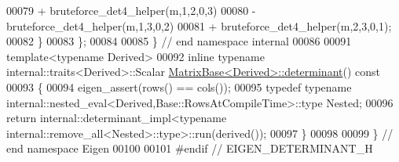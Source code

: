 \begin{DoxyCode}
00079           + bruteforce\_det4\_helper(m,1,2,0,3)
00080           - bruteforce\_det4\_helper(m,1,3,0,2)
00081           + bruteforce\_det4\_helper(m,2,3,0,1);
00082   \}
00083 \};
00084 
00085 \} \textcolor{comment}{// end namespace internal}
00086 
00091 \textcolor{keyword}{template}<\textcolor{keyword}{typename} Derived>
00092 \textcolor{keyword}{inline} \textcolor{keyword}{typename} internal::traits<Derived>::Scalar 
      \hyperlink{group___core___module_a7ad8f77004bb956b603bb43fd2e3c061}{MatrixBase<Derived>::determinant}()\textcolor{keyword}{ const}
00093 \textcolor{keyword}{}\{
00094   eigen\_assert(rows() == cols());
00095   \textcolor{keyword}{typedef} \textcolor{keyword}{typename} internal::nested\_eval<Derived,Base::RowsAtCompileTime>::type Nested;
00096   \textcolor{keywordflow}{return} internal::determinant\_impl<typename internal::remove\_all<Nested>::type>::run(derived());
00097 \}
00098 
00099 \} \textcolor{comment}{// end namespace Eigen}
00100 
00101 \textcolor{preprocessor}{#endif // EIGEN\_DETERMINANT\_H}
\end{DoxyCode}
